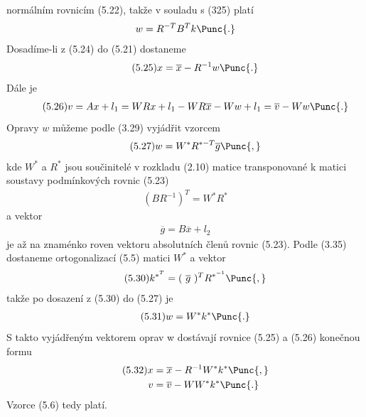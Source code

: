normálním rovnicím (5.22), takže v souladu s (325) platí
%
\begin{align*}
               w = R^{-T}B^{T}k \Punc{.}
\end{align*}
%
Dosadíme-li z (5.24) do (5.21) dostaneme
\begin{align*}
\tag{5.25}     x = \overline{x} - R^{-1}w \Punc{.}
\end{align*}
%
Dále je
%
\begin{align*}
\tag{5.26}     v = Ax + l_1 = WRx + l_1 - WR\overline{x} - Ww + l_1
                 = \overline{v} - Ww \Punc{.}
\end{align*}
%
Opravy $w$ můžeme podle (3.29) vyjádřit vzorcem
%
\begin{align*}
\tag{5.27}        w = W^*R^{*{-T}}\overline{g} \Punc{,}
\end{align*}
%
kde $W^*$ a $R^*$ jsou součinitelé v rozkladu (2.10) matice
transponované k matici soustavy podmínkových rovnic (5.23)
%
\begin{align*}
\tag{5.28}       (BR^{-1})^T = W^*R^*
\end{align*}
%
a vektor
%
\begin{align*}
\tag{5.29}       \overline{g} = B \overline{x}  + l_2
\end{align*}
%
je až na znaménko roven vektoru absolutních členů rovnic (5.23). Podle
(3.35) dostaneme ortogonalizací (5.5) matici $W^*$ a vektor
%
\begin{align*}
\tag{5.30}       k^{*^T} = (~\overline{g}~)^T R^{*^{-1}} \Punc{,}
\end{align*}
%
takže  po dosazení z (5.30) do (5.27) je
%
\begin{align*}
\tag{5.31}       w = W^*k^* \Punc{.}
\end{align*}
%
S takto vyjádřeným vektorem oprav w dostávají rovnice (5.25)
a (5.26) konečnou formu
%
\begin{align*}
\tag{5.32}       x &= \overline{x} - R^{-1} W^*k^* \Punc{,} \\
                 v &= \overline{v} - WW^*k^*      \Punc{.}
\end{align*}
%
%
Vzorce (5.6) tedy platí.



